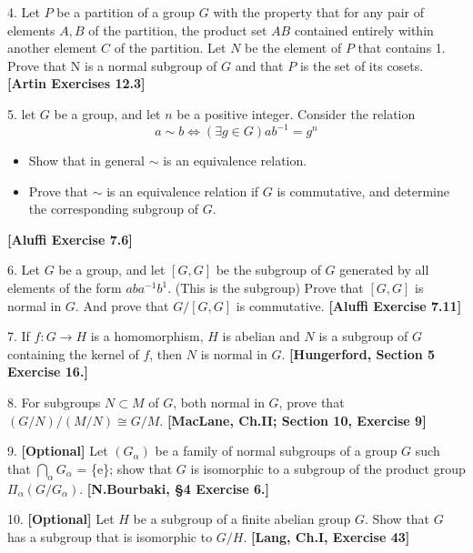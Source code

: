 \documentclass{article}
\newcommand{\tb}[1]{\textbf{#1}}
\begin{document}
\vspace{3mm}
\noindent

4. Let $P$ be a partition of a group $G$ with the property that for any pair of elements $A, B$ of the partition, the product set $AB$ contained entirely within another element $C$ of the partition. Let $N$ be the element of $P$ that contains 1. Prove that N is a normal subgroup of $G$ and that $P$ is the set of its cosets. \tb{[Artin Exercises 12.3]}
\vspace{3mm}
\noindent 

5. let $G$ be a group, and let $n$ be a positive integer. Consider the relation 
\[ a \sim b \iff (\exists g \in G)ab^{-1} = g^{n} \]

\begin{itemize}
	\item Show that in general $\sim$ is  an equivalence relation. 
	\item Prove that $\sim$ is an equivalence relation if $G$ is commutative, and determine the corresponding subgroup of $G$. 
\end{itemize}
\tb{[Aluffi Exercise 7.6]}

\vspace{3mm}
\noindent

6. Let $G$ be a group, and let $[G,G]$ be the subgroup of $G$ generated by all elements of the form $aba^{-1}b^{1}$. (This is the  subgroup) Prove that $[G,G]$ is normal in $G$. And prove that $G/[G,G]$ is commutative. \tb{[Aluffi Exercise 7.11]}

\vspace{3mm}
\noindent

7. If $f: G \to H$ is a homomorphism, $H$ is abelian and $N$ is a subgroup of $G$ containing the kernel of $f$, then $N$ is normal in $G$. \tb{[Hungerford, Section 5 Exercise 16.]}

\vspace{3mm}
\noindent

8. For subgroups $N \subset M$ of $G$, both normal in $G$, prove that $(G/N)/(M/N) \cong G/M$. \tb{[MacLane, Ch.II; Section 10, Exercise 9]}

\vspace{3mm}
\noindent

9. \textbf{[Optional]} Let $(G_{\alpha})$ be a family of normal subgroups of a group $G$ such that $\bigcap_{\alpha}G_{\alpha}$ = \{e\}; show that $G$ is isomorphic to a subgroup of the product group $\Pi_{\alpha}(G/G_{\alpha})$. \tb{[N.Bourbaki, \S 4 Exercise 6.]}  

\vspace{3mm}
\noindent

10. \textbf{[Optional]} Let $H$ be a subgroup of a finite abelian group $G$. Show that $G$ has a subgroup that is isomorphic to $G/H$. \tb{[Lang, Ch.I, Exercise 43]}  
\end{document}
